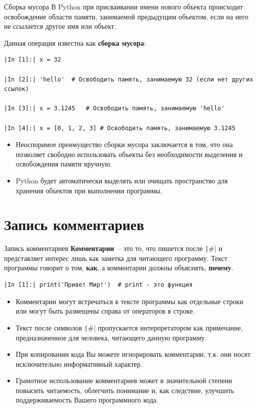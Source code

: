 \documentclass[aspectratio=169]{beamer}	%
\begin{document}
\begin{frame}[fragile]{Сборка мусора}
\scriptsize
В Python при присваивании имени нового объекта происходит освобождение области памяти, занимаемой предыдущим объектом, если на него не ссылается другое имя или объект. 

Данная операция известна как \alert{\textbf{сборка мусора}}:
\begin{verbatim}
|In [1]:| x = 32 

|In [2]:| 'hello'  # Освободить память, занимаемую 32 (если нет других ссылок)

|In [3]:| x = 3.1245   # Освободить память, занимаемую 'hello'

|In [4]:| x = [0, 1, 2, 3] # Освободить память, занимаемую 3.1245
\end{verbatim}
\begin{itemize}
	\item Неоспоримое преимущество сборки мусора заключается в том, что она позволяет свободно использовать объекты без необходимости выделения и освобождения памяти вручную. 
	\item Python  будет автоматически выделять или очищать пространство для хранения объектов при выполнении программы.
\end{itemize}
\vfill	
\end{frame}

\section{Запись комментариев}
\sectionframe

\begin{frame}[fragile]{Запись комментариев}
\scriptsize
\textcolor{extraorange}{\textbf{Комментарии}}~-- это то, что пишется после \texttt|#| и представляет интерес лишь как заметка для читающего программу. Текст программы говорит о том, \textbf{как}, а комментарии должны объяснять, \textbf{почему}.
\begin{verbatim}
|In [1]:| print('Привет Мир!')  # print - это функция 
\end{verbatim}
\begin{itemize}
	\item Комментарии могут встречаться в тексте программы как отдельные строки или могут быть размещены справа от операторов в строке.
	\item Текст после символов \texttt|#| пропускается интерпретатором как примечание, предназначенное для человека, читающего данную программу.
	\item При копировании кода Вы можете игнорировать комментарии, т.к. они носят   исключительно информативный характер.
	\item Грамотное использование комментариев может в значительной степени повысить читаемость, облегчить понимание и, как следствие, улучшить поддерживаемость Вашего программного кода.
\end{itemize}
\vfill
\end{frame}
\end{document}
